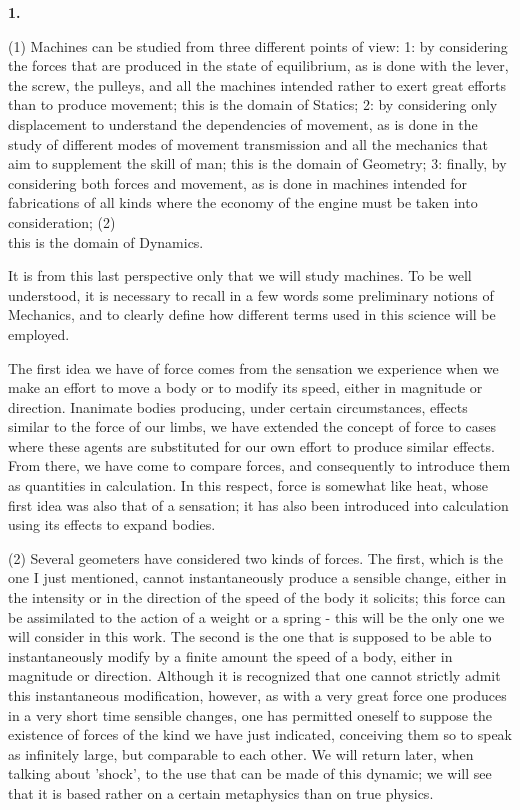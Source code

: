 \documentclass{book}
\begin{document}
\vspace{4mm}
\textbf{1.}
\vspace{4mm} 


(1) Machines can be studied from three different points of view: 1: by considering the forces that are produced in the state of equilibrium, as is done with the lever, the screw, the pulleys, and all the machines intended rather to exert great efforts than to produce movement; this is the domain of Statics; 2: by considering only displacement to understand the dependencies of movement, as is done in the study of different modes of movement transmission and all the mechanics that aim to supplement the skill of man; this 
is the domain of Geometry; 3: finally, by considering both forces and movement, as is done in machines intended for fabrications of all kinds where the economy of the engine must be taken into consideration;
\newpage
(2) \\
this is the domain of Dynamics.


It is from this last perspective only that we will study machines. To be well understood, it is necessary to recall in a few words some preliminary notions of Mechanics, and to clearly define how different terms used in this science will be employed.

The first idea we have of force comes from the sensation we experience when we make an effort to move a body or to modify its speed, either in magnitude or direction. Inanimate bodies producing, under certain circumstances, effects similar to the force of our limbs, we have extended the concept of force to cases where these agents are substituted for our own effort to produce similar effects. From there, we have come to compare forces, and consequently to introduce them as quantities in calculation. In this respect, force is somewhat like heat, whose first idea was also that of a sensation; it has also been introduced into calculation using its effects to expand bodies.

(2) Several geometers have considered two kinds of forces. The first, which is the one I just mentioned, cannot instantaneously produce a sensible change, either in the intensity or in the direction of the speed of the body it solicits; this force can be assimilated to the action of a weight or a spring - this will be the only one we will consider in this work. The second is the one that is supposed to be able to instantaneously modify by a finite amount the speed of a body, either in magnitude or direction. Although it is recognized that one cannot strictly admit this instantaneous modification, however, as with a very great force one produces in a very short time sensible changes, one has permitted oneself to suppose the existence of forces of the kind we have just indicated, conceiving them so to speak as infinitely large, but comparable to each other. We will return later, when talking about 'shock', to the use that can be made of this dynamic; we will see that it is based rather on a certain metaphysics than on true physics.
\end{document}
